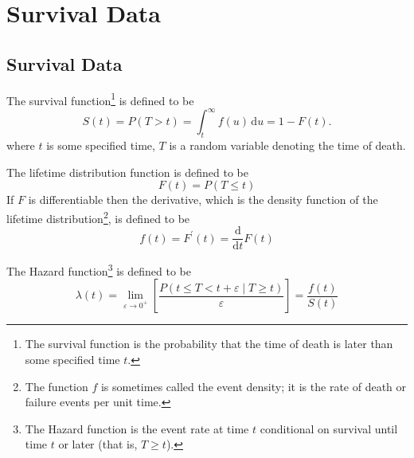 \chapter{Survival Data}

\section{Survival Data}

\begin{definition}

\end{definition}

\begin{definition}
    The survival function\footnote{The survival function is the probability that the time of death is later than some specified time $t$.} is defined to be
    \begin{equation}
        S(t)=P(T>t)=\int_{t}^{\infty}f(u)\,\mathrm{d}u=1-F(t) .
    \end{equation}
    where $t$ is some specified time, $T$ is a random variable denoting the time of death.
\end{definition}

\begin{definition}
    The lifetime distribution function is defined to be
    \begin{equation}
        F(t)=P(T\leq t)
    \end{equation}
    If $F$ is differentiable then the derivative, which is the density function of the lifetime distribution\footnote{The function $f$ is sometimes called the event density; it is the rate of death or failure events per unit time.}, is defined to be
    \begin{equation}
        f(t)=F^{\prime}(t)=\frac{\mathrm{d}}{\mathrm{d}t}F(t)
    \end{equation}
\end{definition}

\begin{definition}
    The Hazard function\footnote{The Hazard function is the event rate at time $t$ conditional on survival until time $t$ or later (that is, $T\geq t$).} is defined to be
    \begin{equation}
        \lambda(t)=\lim_{\varepsilon\rightarrow 0^{+}}\left[\frac{P(t\leq T<t+\varepsilon\mid T\geq t)}{\varepsilon}\right]=\frac{f(t)}{S(t)}
    \end{equation}
\end{definition}

